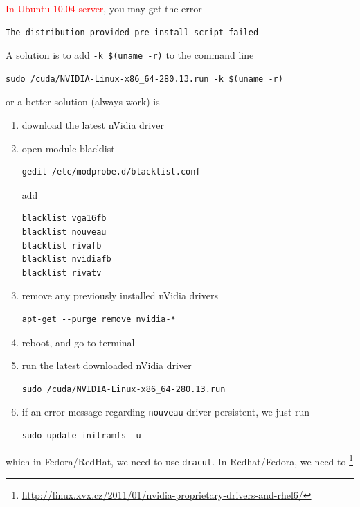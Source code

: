 \textcolor{red}{In Ubuntu 10.04 server}, you may get the error
\begin{verbatim}
The distribution-provided pre-install script failed
\end{verbatim}
A solution is to add \verb!-k $(uname -r)! to the command line
\begin{verbatim}
sudo /cuda/NVIDIA-Linux-x86_64-280.13.run -k $(uname -r)
\end{verbatim}
or a better solution (always work) is
\begin{enumerate}
\item download the latest nVidia driver
\item open module blacklist 
\begin{verbatim}
gedit /etc/modprobe.d/blacklist.conf
\end{verbatim}
add
\begin{verbatim}
blacklist vga16fb
blacklist nouveau
blacklist rivafb
blacklist nvidiafb
blacklist rivatv
\end{verbatim}
\item remove any previously installed nVidia drivers
\begin{verbatim}
apt-get --purge remove nvidia-*
\end{verbatim}
\item reboot, and go to terminal
\item run the latest downloaded nVidia driver
\begin{verbatim}
sudo /cuda/NVIDIA-Linux-x86_64-280.13.run 
\end{verbatim}

\item if an error message regarding \verb!nouveau! driver persistent, we just
run
\begin{verbatim}
sudo update-initramfs -u
\end{verbatim}
\end{enumerate}
which in Fedora/RedHat, we need to use \verb!dracut!. In Redhat/Fedora, we need
to
\footnote{\url{http://linux.xvx.cz/2011/01/nvidia-proprietary-drivers-and-rhel6/}}
